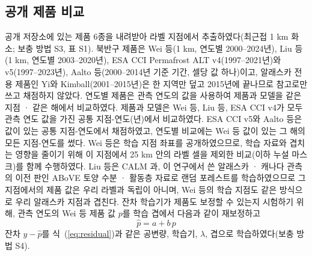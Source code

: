 \subsection{공개 제품 비교}
공개 저장소에 있는 제품 6종을 내려받아 라벨 지점에서 추출하였다(최근접 1 km 화소; 보충 방법 S3, 표 S1). 북반구 제품은 Wei 등\cite{Wei2026}(1 km, 연도별 2000--2024년), Liu 등\cite{Liu2024}(1 km, 연도별 2003--2020년), ESA CCI Permafrost ALT v4(1997--2021년)와 v5(1997--2023년)\cite{Westermann2024,Westermann2025}, Aalto 등\cite{Aalto2018}(2000--2014년 기준 기간, 셀당 값 하나)이고, 알래스카 전용 제품인 Yi와 Kimball\cite{YiKimball2019}(2001--2015년)은 한 지역만 덮고 2015년에 끝나므로 참고로만 쓰고 채점하지 않았다. 연도별 제품은 관측 연도의 값을 사용하여 제품과 모델을 같은 지점 · 같은 해에서 비교하였다. 제품과 모델은 Wei 등, Liu 등, ESA CCI v4가 모두 관측 연도 값을 가진 공통 지점-연도(\nyrscc{}년)에서 비교하였다. ESA CCI v5와 Aalto 등은 값이 있는 공통 지점-연도에서 채점하였고, 연도별 비교에는 Wei 등 값이 있는 그 해의 모든 지점-연도를 썼다. Wei 등은 학습 지점 좌표를 공개하였으므로, 학습 자료와 겹치는 영향을 줄이기 위해 이 지점에서 25 km 안의 라벨 셀을 제외한 비교(이하 누설 마스크)를 함께 수행하였다. Liu 등은 CALM 과, 이 연구에서 쓴 알래스카 · 캐나다 관측의 이전 판인 ABoVE 토양 수분 · 활동층 자료로 랜덤 포레스트를 학습하였으므로\cite{Liu2024} 그 지점에서의 제품 값은 우리 라벨과 독립이 아니며, Wei 등의 학습 지점도 같은 방식으로 우리 알래스카 지점과 겹친다. 잔차 학습기가 제품도 보정할 수 있는지 시험하기 위해, 관측 연도의 Wei 등 제품 값 $p$를 학습 겹에서 다음과 같이 재보정하고
\begin{equation}
\hat{p} = a + b\, p
\label{eq:prod}
\end{equation}
잔차 $y-\hat{p}$를 식~(\ref{eq:residual})과 같은 공변량, 학습기, $\lambda$, 겹으로 학습하였다(보충 방법 S4).

